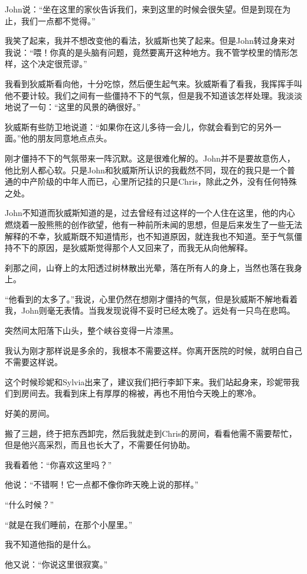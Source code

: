 \documentclass[UTF8]{article}
\begin{document}
\par John说：“坐在这里的家伙告诉我们，来到这里的时候会很失望。但是到现在为止，我们一点都不觉得。”
\par 我笑了起来，我并不想改变他的看法，狄威斯也笑了起来。但是John转过身来对我说：“喂！你真的是头脑有问题，竟然要离开这种地方。我不管学校里的情形怎样，这个决定很荒谬。”
\par 我看到狄威斯看向他，十分吃惊，然后便生起气来。狄威斯看了看我，我挥挥手叫他不要计较。我们之间有一些僵持不下的气氛，但是我不知道该怎样处理。我淡淡地说了一句：“这里的风景的确很好。”
\par 狄威斯有些防卫地说道：“如果你在这儿多待一会儿，你就会看到它的另外一面。”他的朋友同意地点点头。
\par 刚才僵持不下的气氛带来一阵沉默。这是很难化解的。John并不是要故意伤人，他比别人都心软。只是John和狄威斯所认识的我截然不同，现在的我只是一个普通的中产阶级的中年人而已，心里所记挂的只是Chris，除此之外，没有任何特殊之处。
\par John不知道而狄威斯知道的是，过去曾经有过这样的一个人住在这里，他的内心燃烧着一股熊熊的创作欲望，他有一种前所未闻的思想，但是后来发生了一些无法解释的不幸，狄威斯既不知道情形，也不知道原因，就连我也不知道。至于气氛僵持不下的原因，是狄威斯觉得那个人又回来了，而我无从向他解释。
\par 刹那之间，山脊上的太阳透过树林散出光晕，落在所有人的身上，当然也落在我身上。
\par “他看到的太多了。”我说，心里仍然在想刚才僵持的气氛，但是狄威斯不解地看着我，John则毫无表情。当我发现说得不妥时已经太晚了。远处有一只鸟在悲鸣。
\par 突然间太阳落下山头，整个峡谷变得一片漆黑。
\par 我认为刚才那样说是多余的，我根本不需要这样。你离开医院的时候，就明白自己不需要这样说。
\par 这个时候珍妮和Sylvia出来了，建议我们把行李卸下来。我们站起身来，珍妮带我们到房间去。我看到床上有厚厚的棉被，再也不用怕今天晚上的寒冷。
\par 好美的房间。
\par 搬了三趟，终于把东西卸完，然后我就走到Chris的房间，看看他需不需要帮忙，但是他兴高采烈，而且也长大了，不需要任何协助。
\par 我看着他：“你喜欢这里吗？”
\par 他说：“不错啊！它一点都不像你昨天晚上说的那样。”
\par “什么时候？”
\par “就是在我们睡前，在那个小屋里。”
\par 我不知道他指的是什么。
\par 他又说：“你说这里很寂寞。”
\end{document}

